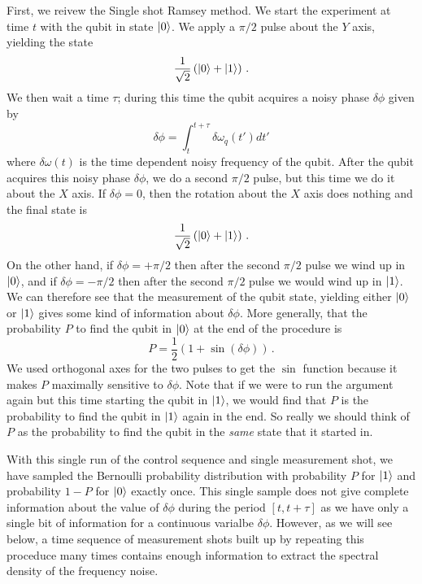 \documentclass[twocolumn]{article}
\begin{document}
First, we reivew the Single shot Ramsey method.
We start the experiment at time $t$ with the qubit in state $| 0 \rangle$.
We apply a $\pi / 2$ pulse about the $Y$ axis, yielding the state
\begin{displaymath}
\frac{1}{\sqrt{2}} \left( | 0 \rangle + | 1 \rangle \right) \, .
\end{displaymath}
We then wait a time $\tau$; during this time the qubit acquires a noisy phase $\delta \phi$ given by
\begin{equation}
\delta \phi = \int_t^{t+\tau} \delta \omega_q (t') dt'
\end{equation}
where $\delta \omega(t)$ is the time dependent noisy frequency of the qubit.
After the qubit acquires this noisy phase $\delta \phi$, we do a second $\pi / 2$ pulse, but this time we do it about the $X$ axis.
If $\delta \phi = 0$, then the rotation about the $X$ axis does nothing and the final state is
\begin{equation}
\frac{1}{\sqrt{2}} \left( | 0 \rangle + | 1 \rangle \right) \, .
\end{equation}
On the other hand, if $\delta \phi = +\pi/2$ then after the second $\pi/2$ pulse we wind up in $| 0 \rangle$, and if $\delta \phi = -\pi/2$ then after the second $\pi/2$ pulse we would wind up in $| 1 \rangle$.
We can therefore see that the measurement of the qubit state, yielding either $| 0 \rangle$ or $| 1 \rangle$ gives some kind of information about $\delta \phi$.
More generally, that the probability $P$ to find the qubit in $| 0 \rangle$ at the end of the procedure is
\begin{equation}
P = \frac{1}{2} \left( 1 + \sin (\delta \phi) \right) \, .
\end{equation}
We used orthogonal axes for the two pulses to get the $\sin$ function because it makes $P$ maximally sensitive to $\delta \phi$.
Note that if we were to run the argument again but this time starting the qubit in $| 1 \rangle$, we would find that $P$ is the probability to find the qubit in $| 1 \rangle$ again in the end.
So really we should think of $P$ as the probability to find the qubit in the \emph{same} state that it started in.

With this single run of the control sequence and single measurement shot, we have sampled the Bernoulli probability distribution with probability $P$ for $| 1 \rangle$ and probability $1-P$ for $| 0 \rangle$ exactly once.
This single sample does not give complete information about the value of $\delta \phi$ during the period $[t, t+\tau]$ as we have only a single bit of information for a continuous varialbe $\delta \phi$.
However, as we will see below, a time sequence of measurement shots built up by repeating this proceduce many times contains enough information to extract the spectral density of the frequency noise.
\end{document}
